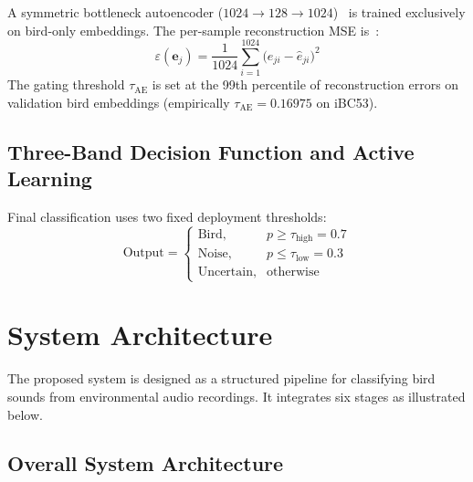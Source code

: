 \documentclass[a4paper,12pt]{article}
\begin{document}
\noindent
A symmetric bottleneck autoencoder ($1024 \to 128 \to 1024$)~\cite{Hinton} is trained
exclusively on bird-only embeddings. The per-sample reconstruction MSE is~\cite{Ntalampiras}:
\[
    \varepsilon(\mathbf{e}_j) = \frac{1}{1024}\sum_{i=1}^{1024}
                                \bigl(e_{ji} - \hat{e}_{ji}\bigr)^2
\]
The gating threshold $\tau_{\mathrm{AE}}$ is set at the 99th percentile of reconstruction
errors on validation bird embeddings (empirically $\tau_{\mathrm{AE}} = 0.16975$ on iBC53).

\subsection{Three-Band Decision Function and Active Learning}

\noindent
Final classification uses two fixed deployment thresholds:
\[
    \text{Output} =
    \begin{cases}
        \text{Bird},      & p \geq \tau_{\mathrm{high}} = 0.7 \\
        \text{Noise},     & p \leq \tau_{\mathrm{low}}  = 0.3 \\
        \text{Uncertain}, & \text{otherwise}
    \end{cases}
\]

\section{System Architecture}

\noindent
The proposed system is designed as a structured pipeline for classifying bird sounds from
environmental audio recordings. It integrates six stages as illustrated below.

\subsection{Overall System Architecture}
\end{document}
